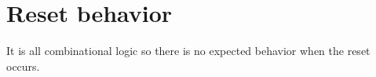 \section{Reset behavior}

It is all combinational logic so there is no expected behavior when the reset occurs.




